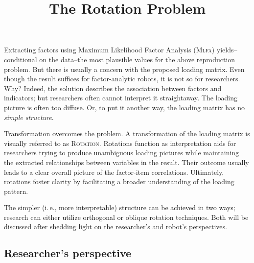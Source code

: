 \documentclass[jou, 11pt]{apa7}
\title{The Rotation Problem}
\begin{document}
\maketitle

Extracting factors using Maximum Likelihood Factor Analysis (\textsc{Mlfa})
yields--conditional on the data--the most plausible values for the above
reproduction problem. But there is usually a concern with the proposed loading
matrix. Even though the result suffices for factor-analytic robots, it is not
so for researchers. Why? Indeed, the solution describes the association between
factors and indicators; but researchers often cannot interpret it straightaway.
The loading picture is often too diffuse. Or, to put it another way, the
loading matrix has no \textit{simple
  structure}.

Transformation overcomes the problem. A transformation of the loading matrix is
visually referred to as \textsc{Rotation}. Rotations function as interpretation
aids for researchers trying to produce unambiguous loading pictures while
maintaining the extracted relationships between variables in the result. Their
outcome usually leads to a clear overall picture of the factor-item
correlations. Ultimately, rotations foster clarity by facilitating a broader
understanding of the loading pattern.

The simpler (i.\,e., more interpretable) structure can be achieved in two ways;
research can either utilize orthogonal or oblique rotation techniques. Both
will be discussed after shedding light on the researcher’s and robot’s
perspectives.

\subsection{Researcher’s perspective}
\end{document}
